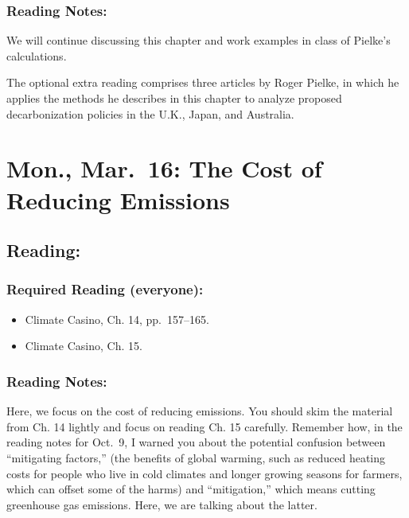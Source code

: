 \documentclass[
]{article}
\providecommand{\tightlist}{%
  \setlength{\itemsep}{0pt}\setlength{\parskip}{0pt}}
\begin{document}
\hypertarget{reading-notes-20}{%
\subsubsection{Reading Notes:}\label{reading-notes-20}}

We will continue discussing this chapter and work examples in class of
Pielke's calculations.

The optional extra reading comprises three articles by Roger Pielke, in
which he applies the methods he describes in this chapter to analyze
proposed decarbonization policies in the U.K., Japan, and Australia.

\hypertarget{mon.-mar.-16-the-cost-of-reducing-emissions}{%
\section{Mon., Mar.~16: The Cost of Reducing
Emissions}\label{mon.-mar.-16-the-cost-of-reducing-emissions}}

\hypertarget{reading-26}{%
\subsection{Reading:}\label{reading-26}}

\hypertarget{required-reading-everyone-21}{%
\subsubsection{Required Reading
(everyone):}\label{required-reading-everyone-21}}

\begin{itemize}
\tightlist
\item
  Climate Casino, Ch. 14, pp.~157--165.
\item
  Climate Casino, Ch. 15.
\end{itemize}

\hypertarget{reading-notes-21}{%
\subsubsection{Reading Notes:}\label{reading-notes-21}}

Here, we focus on the cost of reducing emissions. You should skim the
material from Ch. 14 lightly and focus on reading Ch. 15 carefully.
Remember how, in the reading notes for Oct.~9, I warned you about the
potential confusion between ``mitigating factors,'' (the benefits of
global warming, such as reduced heating costs for people who live in
cold climates and longer growing seasons for farmers, which can offset
some of the harms) and ``mitigation,'' which means cutting greenhouse
gas emissions. Here, we are talking about the latter.
\end{document}
